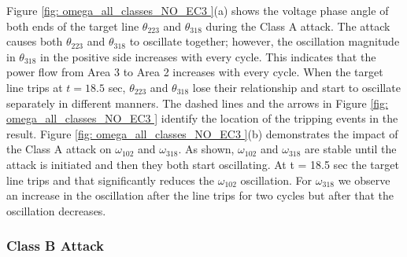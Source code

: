 \documentclass[journal]{IEEEtran}
\begin{document}
Figure \ref{fig: omega_all_classes_NO_EC3 }(a) shows the voltage phase angle of both ends of the target line $ \theta_{223}$ and $\theta_{318} $ during the Class A attack. 
The attack causes both $ \theta_{223}$ and $\theta_{318} $ to oscillate together; however, the oscillation magnitude in $\theta_{318}$ in the positive side increases with every cycle. This indicates that the power flow from Area 3 to Area 2 increases with every cycle. When the target line trips at $t=18.5$ sec, $ \theta_{223}$ and $\theta_{318} $ lose their relationship and start to oscillate separately in different manners. The dashed lines and the arrows in Figure \ref{fig: omega_all_classes_NO_EC3 } identify the location of the tripping events in the result. Figure \ref{fig: omega_all_classes_NO_EC3 }(b) demonstrates the impact of the Class A attack on $ \omega_{102}$ and $\omega_{318}$. As shown, $ \omega_{102}$ and $\omega_{318}$ are stable until the attack is initiated and then they both start oscillating. At t = 18.5 sec the target line trips and that significantly reduces the $ \omega_{102}$ oscillation. For $\omega_{318}$ we observe an increase in the oscillation after the line trips for two cycles but after that the oscillation decreases.     



\subsubsection{Class B Attack} 
\end{document}
